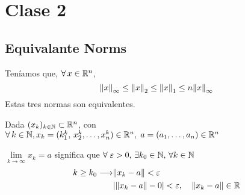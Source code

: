 \chapter{Clase 2}
\section{Equivalante Norms}
Teníamos que, $\forall\, x \in \mathbb{R}^{n}$,
$$
	\norm{x}_{\infty} \leq \norm{x}_2 \leq \norm{x}_1 \leq n \norm{x}_{\infty}
$$
Estas tres normas son equivalentes.

Dada $(x_k)_{k \in \mathbb{N}} \subset \mathbb{R}^{n}$, con $\forall \, k\in \mathbb{N}, x_k = (k_1^k, \, x_2^k, \ldots, x_n^k) \in \mathbb{R}^{n}, \; a = (a_1, \ldots ,a_n)\in \mathbb{R}^{n}$

$
	\lim\limits_{k \to \infty} x_k = a $ significa que $\forall\; \varepsilon>0,\, \exists k_0 \in \mathbb{N}, \, \forall k \in \mathbb{N}
$
\begin{align*}
	k \geq k_0 \longrightarrow & \norm{x_k-a} < \varepsilon                                      \\
	                           & \abs{ \norm{x_k-a}-0} < \varepsilon,  \quad \norm{x_k-a} \in \mathbb{R}
\end{align*}


